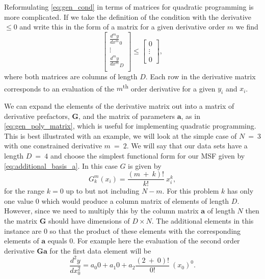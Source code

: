 Reformulating \cref{eq:gen_cond} in terms of matrices for quadratic programming is more complicated. If we take the definition of the condition with the derivative $\leq 0$ and write this in the form of a matrix for a given derivative order $m$ we find
\begin{equation}
    \begin{bmatrix}
    \frac{d^my}{dx^m}_0 \\
    \vdots \\
    \frac{d^my}{dx^m}_{D} \\
    \end{bmatrix}
    \leq
    \begin{bmatrix}
    0 \\ \vdots \\ 0
    \end{bmatrix},
    \label{eq:derivative_matrices}
\end{equation}
where both matrices are columns of length $D$. Each row in the derivative matrix corresponds to an evaluation of the $m$\textsuperscript{th} order derivative for a given $y_i$ and $x_i$.

We can expand the elements of the derivative matrix out into a matrix of derivative prefactors, $\mathbf{G}$, and the matrix of parameters $\mathbf{a}$, as in \cref{eq:gen_poly_matrix}, which is useful for implementing quadratic programming. This is best illustrated with an example, we will look at the simple case of $N~=~3$ with one constrained derivative $m~=~2$. We will say that our data sets have a length $D~=~4$ and choose the simplest functional form for our MSF given by \cref{eq:additional_basis_a}. In this case $G$ is given by
\begin{equation}
    G_k^m(x_i) = \frac{(m~+~k)!}{k!}~x_i^k,
    \label{eq:prefactors}
\end{equation}
for the range $k = 0$ up to but not including $N-m$. For this problem $k$ has only one value $0$ which would produce a column matrix of elements of length $D$. However, since we need to multiply this by the column matrix $\mathbf{a}$ of length $N$ then the matrix $\mathbf{G}$ should have dimensions of $D \times N$. The additional elements in this instance are $0$ so that the product of these elements with the corresponding elements of $\mathbf{a}$ equals $0$. For example here the evaluation of the second order derivative $\mathbf{Ga}$ for the first data element will be
\begin{equation}
    \frac{d^2y}{dx_0^2} = a_0 0 + a_1 0 + a_2 \frac{(2~+~0)!}{0!}~(x_0)^0.
\end{equation}

